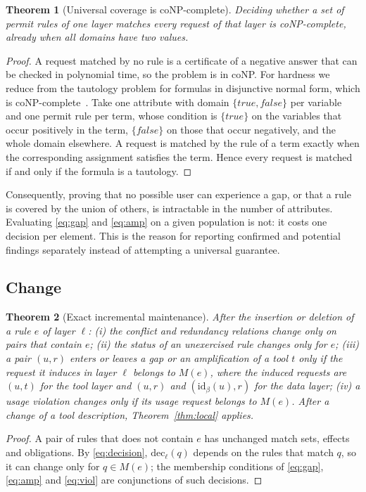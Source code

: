 \documentclass[preprint,12pt]{elsarticle}
\newtheorem{theorem}{Theorem}
\theoremstyle{definition}
\theoremstyle{remark}
\newcommand{\dec}{\mathrm{dec}}
\newcommand{\ident}{\mathrm{id}}
\begin{document}
\begin{theorem}[Universal coverage is coNP-complete]\label{thm:hard}
Deciding whether a set of permit rules of one layer matches every request of that layer is coNP-complete, already when all domains have two values.
\end{theorem}
\begin{proof}
A request matched by no rule is a certificate of a negative answer that can be checked in polynomial time, so the problem is in coNP. For hardness we reduce from the tautology problem for formulas in disjunctive normal form, which is coNP-complete~\cite{garey1979intractability}. Take one attribute with domain $\{\mathit{true}, \mathit{false}\}$ per variable and one permit rule per term, whose condition is $\{\mathit{true}\}$ on the variables that occur positively in the term, $\{\mathit{false}\}$ on those that occur negatively, and the whole domain elsewhere. A request is matched by the rule of a term exactly when the corresponding assignment satisfies the term. Hence every request is matched if and only if the formula is a tautology.
\end{proof}
Consequently, proving that no possible user can experience a gap, or that a rule is covered by the union of others, is intractable in the number of attributes. Evaluating \eqref{eq:gap} and \eqref{eq:amp} on a given population is not: it costs one decision per element. This is the reason for reporting confirmed and potential findings separately instead of attempting a universal guarantee.

\subsection{Change}
\begin{theorem}[Exact incremental maintenance]\label{thm:incremental}
After the insertion or deletion of a rule $e$ of layer $\ell$: (i) the conflict and redundancy relations change only on pairs that contain $e$; (ii) the status of an unexercised rule changes only for $e$; (iii) a pair $(u, r)$ enters or leaves a gap or an amplification of a tool $t$ only if the request it induces in layer $\ell$ belongs to $M(e)$, where the induced requests are $(u, t)$ for the tool layer and $(u, r)$ and $(\ident_\beta(u), r)$ for the data layer; (iv) a usage violation changes only if its usage request belongs to $M(e)$. After a change of a tool description, Theorem~\ref{thm:local} applies.
\end{theorem}
\begin{proof}
A pair of rules that does not contain $e$ has unchanged match sets, effects and obligations. By \eqref{eq:decision}, $\dec_\ell(q)$ depends on the rules that match $q$, so it can change only for $q \in M(e)$; the membership conditions of \eqref{eq:gap}, \eqref{eq:amp} and \eqref{eq:viol} are conjunctions of such decisions.
\end{proof}
\end{document}
